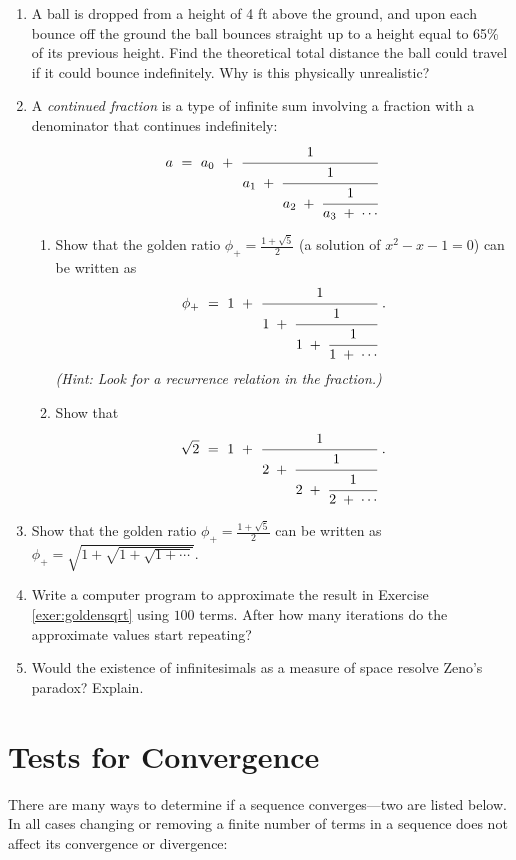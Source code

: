 {\begin{enumerate}[item-label={\bfseries \arabic*.}]
\begin{enumerate}[item-label={\bfseries (\alph*)}]
\[
F_n ~=~ \frac{\phi_{+}^{n} \;-\; \phi_{-}^{n}}{\sqrt{5}} \quad\text{for $n\ge 0$.}
\]
\end{enumerate}
 \item A ball is dropped from a height of 4 ft above the ground, and upon
  each bounce off the ground the ball bounces straight up to a height equal to
  65\% of its previous height. Find the theoretical total distance the ball
  could travel if it could bounce indefinitely. Why is this physically
  unrealistic?
 \item A \emph{continued fraction} is a type of
  infinite sum involving a fraction with a denominator that continues
  indefinitely:
\[
a ~=~ a_0 ~+~ \cfrac{1}{a_1 \;+\; \cfrac{1}{a_2 \;+\; \cfrac{1}{a_3 \;+\; \cdots}}}
\]
\begin{enumerate}[item-label={\bfseries (\alph*)}]
 \item Show that the golden ratio $\phi_{+} = \frac{1+\sqrt{5}}{2}$ (a solution of
 $x^2-x-1=0$) can be written as
\[
\phi_{+} ~=~ 1 ~+~ \cfrac{1}{1 \;+\; \cfrac{1}{1 \;+\; \cfrac{1}{1 \;+\; \cdots}}} ~.
\]
\emph{(Hint: Look for a recurrence relation in the fraction.)}
 \item Show that
\[
\sqrt{2} ~=~ 1 ~+~ \cfrac{1}{2 \;+\; \cfrac{1}{2 \;+\; \cfrac{1}{2 \;+\; \cdots}}} ~.
\]
\end{enumerate}
 \item\label{exer:goldensqrt} Show that the golden ratio
  $\phi_{+} = \frac{1+\sqrt{5}}{2}$ can be written as
  $\phi_{+} = \sqrt{1 + \sqrt{1 + \sqrt{1 + \cdots}}}$.
 \item Write a computer program to approximate the result in Exercise
  \ref{exer:goldensqrt} using $100$ terms. After how many iterations do the
   approximate values start repeating?
 \item Would the existence of infinitesimals as a measure of space resolve
  Zeno's paradox? Explain.
\end{enumerate}
}
\newpage
\section{Tests for Convergence}
There are many ways to determine if a sequence converges---two are
listed below. In all cases changing or removing a finite number of terms in a
sequence does not affect its convergence or divergence:

